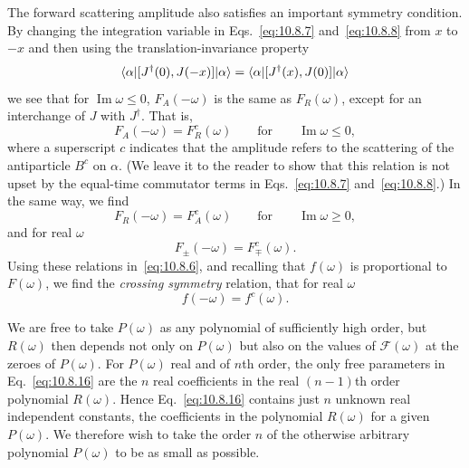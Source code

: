 The forward scattering amplitude also satisfies an important symmetry
condition. By changing the integration variable in Eqs.~\eqref{eq:10.8.7}
and~\eqref{eq:10.8.8} from $x$ to $-x$ and then using the
translation-invariance property
\begin{equation*}
  \langle \alpha\rvert[J^\dagger(0),J(-x)]\lvert \alpha\rangle
  =\langle \alpha\rvert[J^\dagger(x),J(0)]\lvert \alpha\rangle
\end{equation*}
we see that for $\operatorname{Im}\omega\leq0$, $F_A(-\omega)$ is the same
as $F_R(\omega)$, except for an interchange of $J$ with $J^\dagger$. That is,
\begin{equation*}
  F_A(-\omega)=F_R^c(\omega)
  \qquad\text{for}\qquad\operatorname{Im}\omega\leq0,
\end{equation*}
where a superscript $c$ indicates that the amplitude refers to the scattering
of the antiparticle $B^c$ on $\alpha$. (We leave it to the reader to show
that this relation is not upset by the equal-time commutator terms in
Eqs.~\eqref{eq:10.8.7} and~\eqref{eq:10.8.8}.) In the same way, we find
\begin{equation*}
  F_R(-\omega)=F_A^c(\omega)
  \qquad\text{for}\qquad\operatorname{Im}\omega\geq0,
\end{equation*}
and for real $\omega$
\begin{equation*}
  F_\pm(-\omega)=F_\mp^c(\omega).
\end{equation*}
Using these relations in~\eqref{eq:10.8.6}, and recalling that $f(\omega)$ is
proportional to $F(\omega)$, we find the \emph{crossing symmetry} relation,
that for real $\omega$
\begin{equation}
  f(-\omega)=f^c(\omega).
  \tag{10.8.25}\label{eq:10.8.25}
\end{equation}

We are free to take $P(\omega)$ as any polynomial of sufficiently high order,
but $R(\omega)$ then depends not only on $P(\omega)$ but also on the values
of $\mathcal F(\omega)$ at the zeroes of $P(\omega)$. For $P(\omega)$ real
and of $n$th order, the only free parameters in Eq.~\eqref{eq:10.8.16} are
the $n$ real coefficients in the real $(n-1)$th order polynomial $R(\omega)$.
Hence Eq.~\eqref{eq:10.8.16} contains just $n$ unknown real independent
constants, the coefficients in the polynomial $R(\omega)$ for a given
$P(\omega)$. We therefore wish to take the order $n$ of the otherwise
arbitrary polynomial $P(\omega)$ to be as small as possible.

